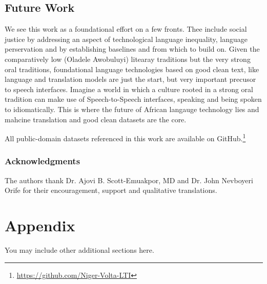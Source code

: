 \documentclass{article} %
\begin{document}
\subsection{Future Work}
We see this work as a foundational effort on a few fronts. Thee include social justice by addressing an aspect of technological language inequality, language perservation and by establishing baselines and from which to build on. Given the comparatively low (Oladele Awobuluyi) litearay traditions but the very strong oral traditions, foundational language technologies based on good clean text, like language and translation models are just the start, but very important precusor to speech interfaces. Imagine a world in which a culture rooted in a strong oral tradition can make use of Speech-to-Speech interfaces, speaking and being spoken to idiomatically. This is where the future of African langauge technology lies and mahcine translation and good clean datasets are the core.   




All public-domain datasets referenced in this work are available on GitHub.\footnote{\url{https://github.com/Niger-Volta-LTI}}

\subsubsection*{Acknowledgments}
The authors thank Dr. Ajovi B. Scott-Emuakpor, MD and Dr. John Nevboyeri Orife for their encouragement, support and qualitative translations.




\appendix
\section{Appendix}
You may include other additional sections here. 
\end{document}
